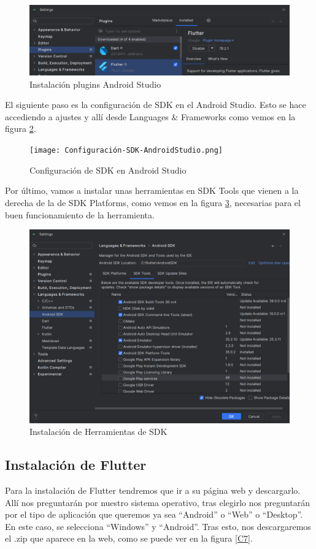 \begin{figure}[H]
    \centering
    \includegraphics[width=0.8\linewidth]{PlugingsAndroidStudio.png}
    \caption{Instalación plugins Android Studio}
    \label{C4}
\end{figure}


El siguiente paso es la configuración de SDK en el Android Studio. Esto se hace accediendo a ajustes y allí desde Languages \& Frameworks como vemos en la figura \ref{C5}.

\begin{figure}[H]
    \centering
    \texttt{[image: Configuración-SDK-AndroidStudio.png]}
    \caption{Configuración de SDK en Android Studio}
    \label{C5}
\end{figure}


Por último, vamos a instalar unas herramientas en SDK Tools que vienen a la derecha de la de SDK Platforms, como vemos en la figura \ref{C6}, necesarias para el buen funcionamiento de la herramienta.

\begin{figure}[H]
    \centering
    \includegraphics[width=0.8\linewidth]{Configuracion-SDKTools-AndroidStudio.png}
    \caption{Instalación de Herramientas de SDK}
    \label{C6}
\end{figure}

\subsection{\textbf{Instalación de Flutter}}
Para la instalación de Flutter tendremos que ir a su página web \cite{Flutter} y descargarlo. Allí nos preguntarán por nuestro sistema operativo, tras elegirlo nos preguntarán por el tipo de aplicación que queremos ya sea ``Android'' o ``Web'' o ``Desktop''. En este caso, se selecciona ``Windows'' y ``Android''. Tras esto, nos descargaremos el .zip que aparece en la web, como se puede ver en la figura \ref{C7}.

